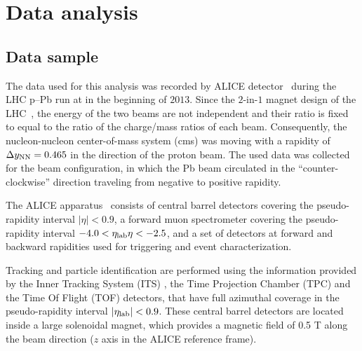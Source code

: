 
\section{Data analysis}

\subsection{Data sample}

The data used for this analysis was recorded by ALICE detector~\cite{Aamodt:2008zz} during the LHC p--Pb run at  in the beginning of $2013$. Since the $2$-in-$1$ magnet design of the LHC~\cite{Evans:2008zzb}, the energy of the two beams are not independent and their ratio is fixed to equal to the ratio of the charge/mass ratios of each beam. Consequently, the nucleon-nucleon center-of-mass system (cms) was moving with a rapidity of $\Delta y_{\rm NN}=0.465$ in the direction of the proton beam. The used data was collected for the beam configuration, in which the Pb beam circulated in the ``counter-clockwise'' direction traveling from negative to positive rapidity.

The ALICE apparatus~\cite{Aamodt:2008zz} consists of central barrel detectors covering the pseudo-rapidity interval $|\eta|<0.9$, a forward muon spectrometer covering the pseudo-rapidity interval $-4.0<\eta_{\rm lab}{\eta}<-2.5$, and a set of detectors at forward and backward rapidities used for triggering and event characterization. 

Tracking and particle identification are performed using the information provided by the Inner Tracking System (ITS) \cite{Aamodt:2010aa}, the Time Projection Chamber (TPC) \cite{Alme:2010ke} and the Time Of Flight (TOF) \cite{Akindinov:2013tea} detectors, that have full azimuthal coverage in the pseudo-rapidity interval $|\eta_{\rm lab}|<0.9$. 
These central barrel detectors are located inside a large solenoidal magnet, which provides a magnetic field of 0.5 T along the beam direction ($z$ axis in the ALICE reference frame). 

